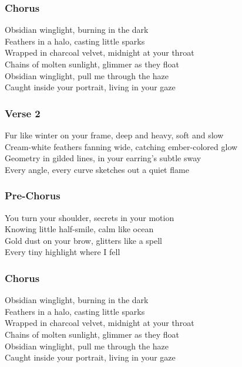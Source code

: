 \subsubsection{Chorus}\label{chorus-21}

Obsidian winglight, burning in the dark\\
Feathers in a halo, casting little sparks\\
Wrapped in charcoal velvet, midnight at your throat\\
Chains of molten sunlight, glimmer as they float\\
Obsidian winglight, pull me through the haze\\
Caught inside your portrait, living in your gaze

\subsubsection{Verse 2}\label{verse-2-9}

Fur like winter on your frame, deep and heavy, soft and slow\\
Cream-white feathers fanning wide, catching ember-colored glow\\
Geometry in gilded lines, in your earring's subtle sway\\
Every angle, every curve sketches out a quiet flame

\subsubsection{Pre-Chorus}\label{pre-chorus-9}

You turn your shoulder, secrets in your motion\\
Knowing little half-smile, calm like ocean\\
Gold dust on your brow, glitters like a spell\\
Every tiny highlight where I fell

\subsubsection{Chorus}\label{chorus-22}

Obsidian winglight, burning in the dark\\
Feathers in a halo, casting little sparks\\
Wrapped in charcoal velvet, midnight at your throat\\
Chains of molten sunlight, glimmer as they float\\
Obsidian winglight, pull me through the haze\\
Caught inside your portrait, living in your gaze

